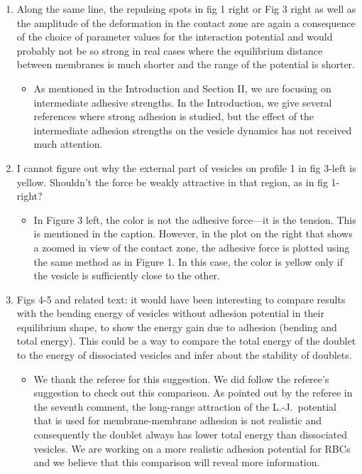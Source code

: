 \documentclass[11pt]{article}
\newcommand{\comment}[1]{{\color{blue} #1}}
\begin{document}
\begin{enumerate}
\item\comment{Along the same line, the repulsing spots in fig 1 right or Fig 3
right as well as the amplitude of the deformation in the contact zone
are again a consequence of the choice of parameter values for the
interaction potential and would probably not be so strong in real
cases where the equilibrium distance between membranes is much shorter
and the range of the potential is shorter.}
\begin{itemize}
  \item As mentioned in the Introduction and Section II, we are focusing
    on intermediate adhesive strengths.  In the Introduction, we give
    several references where strong adhesion is studied, but the effect
    of the intermediate adhesion strengths on the vesicle dynamics has
    not received much attention.
\end{itemize}

\item\comment{I cannot figure out why the external part of vesicles on
  profile 1 in fig 3-left is yellow. Shouldn't the force be weakly
  attractive in that region, as in fig 1-right?}
\begin{itemize}
  \item In Figure 3 left, the color is not the adhesive force---it is the
    tension.  This is mentioned in the caption.  However, in the plot on
    the right that shows a zoomed in view of the contact zone, the
    adhesive force is plotted using the same method as in Figure 1.  In
    this case, the color is yellow only if the vesicle is sufficiently
    close to the other.
\end{itemize}

\item\comment{Figs 4-5 and related text: it would have been interesting
  to compare results with the bending energy of vesicles without
  adhesion potential in their equilibrium shape, to show the energy gain
  due to adhesion (bending and total energy). This could be a way to
  compare the total energy of the doublet to the energy of dissociated
  vesicles and infer about the stability of doublets.}
\begin{itemize}
  \item We thank the referee for this suggestion. We did follow the
    referee's suggestion to check out this comparison. As pointed out by
    the referee in the seventh comment, the long-range attraction of the
    L.-J.~potential that is used for membrane-membrane adhesion is not
    realistic and consequently the doublet always has lower total energy
    than dissociated vesicles. We are working on a more realistic
    adhesion potential for RBCs and we believe that this comparison will
    reveal more information.
\end{itemize}


\end{enumerate}
\end{document}
